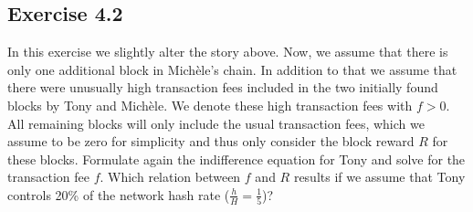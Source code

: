 \documentclass[12pt]{article}
\begin{document}
	\subsection*{Exercise 4.2}
	
	In this exercise we slightly alter the story above. Now, we assume that there is only one additional block in Michèle's chain. In addition to that we assume that there were unusually high transaction fees included in the two initially found blocks by Tony and Michèle. We denote these high transaction fees with $f > 0$. All remaining blocks will only include the usual transaction fees, which we assume to be zero for simplicity and thus only consider the block reward $R$ for these blocks. Formulate again the indifference equation for Tony and solve for the transaction fee $f$. Which relation between $f$ and $R$ results if we assume that Tony controls 20\% of the network hash rate ($\frac{h}{H} = \frac{1}{5}$)?
	
\end{document}
